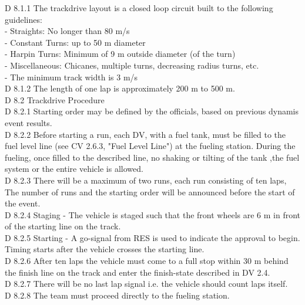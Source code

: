 \documentclass{article}
\begin{document}
D 8.1.1 The trackdrive layout is a closed loop circuit built to the following guidelines:\\
	- Straights: No longer than 80 m/s\\
	- Constant Turns: up to 50 m diameter\\
	- Harpin Turns: Minimum of 9 m outside diameter (of the turn)\\
	- Miscellaneous: Chicanes, multiple turns, decreasing radius turns, etc.\\
	- The minimum track width is 3 m/s\\

D 8.1.2 The length of one lap is approximately 200 m to 500 m.\\

D 8.2 Trackdrive Procedure\\

D 8.2.1 Starting order may be defined by the officials, based on previous dynamis event results.\\

D 8.2.2 Before starting a run, each DV, with a fuel tank, must be filled to the fuel level line (see CV 2.6.3, "Fuel Level Line") at the fueling station. During the fueling, once filled to the described line, no shaking or tilting of the tank ,the fuel system or the entire vehicle is allowed.\\

D 8.2.3 There will be a maximum of two runs, each run consisting of ten laps, The number of runs and the starting order will be announced before the start of the event.\\

D 8.2.4 Staging - The vehicle is staged such that the front wheels are 6 m in front of the starting line on the track.\\

D 8.2.5 Starting - A go-signal from RES is used to indicate the approval to begin. Timing starts after the vehicle crosses the starting line.\\

D 8.2.6 After ten laps the vehicle must come to a full stop within 30 m behind the finish line on the track and enter the finish-state described in DV 2.4.\\

D 8.2.7 There will be no last lap signal i.e. the vehicle should count laps itself.\\

D 8.2.8 The team must proceed directly to the fueling station.\\
\end{document}
